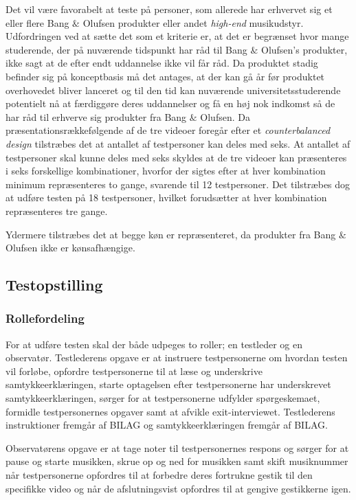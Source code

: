 Det vil være favorabelt at teste på personer, som allerede har erhvervet sig et eller flere Bang $\&$ Olufsen produkter eller andet \textit{high-end} musikudstyr. Udfordringen ved at sætte det som et kriterie er, at det er begrænset hvor mange studerende, der på nuværende tidspunkt har råd til Bang $\&$ Olufsen's produkter, ikke sagt at de efter endt uddannelse ikke vil får råd. Da produktet stadig befinder sig på konceptbasis må det antages, at der kan gå år før produktet overhovedet bliver lanceret og til den tid kan nuværende universitetsstuderende potentielt nå at færdiggøre deres uddannelser og få en høj nok indkomst så de har råd til erhverve sig produkter fra Bang $\&$ Olufsen. \blankline
%        
Da præsentationsrækkefølgende af de tre videoer foregår efter et \textit{counterbalanced design} tilstræbes det at antallet af testpersoner kan deles med seks. At antallet af testpersoner skal kunne deles med seks skyldes at de tre videoer kan præsenteres i seks forskellige kombinationer, hvorfor der sigtes efter at hver kombination minimum repræsenteres to gange, svarende til 12 testpersoner. Det tilstræbes dog at udføre testen på 18 testpersoner, hvilket forudsætter at hver kombination repræsenteres tre gange. 

Ydermere tilstræbes det at begge køn er repræsenteret, da produkter fra Bang $\&$ Olufsen ikke er kønsafhængige. 
%

\subsection{Testopstilling}
\label{TestopstillingValgAfGestikker}
%

\subsubsection{Rollefordeling}
\label{RollerfordelingValgAfGestikker}
%
For at udføre testen skal der både udpeges to roller; en testleder og en observatør. Testlederens opgave er at instruere testpersonerne om hvordan testen vil forløbe, opfordre testpersonerne til at læse og underskrive samtykkeerklæringen, starte optagelsen efter testpersonerne har underskrevet samtykkeerklæringen, sørger for at testpersonerne udfylder spørgeskemaet, formidle testpersonernes opgaver samt at afvikle exit-interviewet. Testlederens instruktioner fremgår af BILAG og samtykkeerklæringen fremgår af BILAG. 

Observatørens opgave er at tage noter til testpersonernes respons og sørger for at pause og starte musikken, skrue op og ned for musikken samt skift musiknummer når testpersonerne opfordres til at forbedre deres fortrukne gestik til den specifikke video og når de afslutningsvist opfordres til at gengive gestikkerne igen. 


